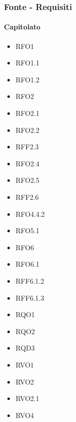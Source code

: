 \subsubsection{Fonte - Requisiti}

\paragraph{Capitolato}
\quad
\begin{multicols}{3}
    \begin{itemize}
        \item RFO1
        \item RFO1.1
        \item RFO1.2
        \item RFO2
        \item RFO2.1
        \item RFO2.2
        \item RFF2.3
        \item RFO2.4
        \item RFO2.5
        \item RFF2.6
        \item RFO4.4.2
        \item RFO5.1
        \item RFO6
        \item RFO6.1
        \item RFF6.1.2
        \item RFF6.1.3
        \item RQO1
        \item RQO2
        \item RQD3
        \item RVO1
        \item RVO2
        \item RVO2.1
        \item RVO4
    \end{itemize}
\end{multicols}


